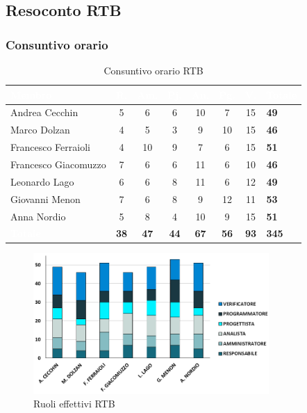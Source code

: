 \newpage

\subsection{Resoconto RTB}
\subsubsection{Consuntivo orario}
{
\setlength{\tabcolsep}{10pt}
\renewcommand{\arraystretch}{1.5}
\begin{table}[h!]
    \centering
    \begin{tabularx}{\textwidth}{| l | c | c | c | c | c | c | X |}
        \hline
        \rowcolor{headerrow} \textbf{\textcolor{white}{Membro}} & \textbf{\textcolor{white}{R.}} & \textbf{\textcolor{white}{Am.}} & \textbf{\textcolor{white}{Pj.}} & \textbf{\textcolor{white}{An.}} & \textbf{\textcolor{white}{Pg.}} & \textbf{\textcolor{white}{V.}} & \textbf{\textcolor{white}{Totale}} \\
        \hline
        Andrea Cecchin & 5 & 6 & 6 & 10 & 7 & 15 & \textbf{49} \\
        \hline
        Marco Dolzan & 4 & 5 & 3 & 9 & 10 & 15 & \textbf{46} \\
        \hline
        Francesco Ferraioli & 4 & 10 & 9 & 7 & 6 & 15 & \textbf{51} \\
        \hline  
        Francesco Giacomuzzo & 7 & 6 & 6 & 11 & 6 & 10 & \textbf{46} \\
        \hline
        Leonardo Lago & 6 & 6 & 8 & 11 & 6 & 12 & \textbf{49} \\
        \hline
        Giovanni Menon & 7 & 6 & 8 & 9 & 12 & 11 & \textbf{53} \\
        \hline
        Anna Nordio & 5 & 8 & 4 & 10 & 9 & 15 & \textbf{51} \\
        \hline
    \cellcolor{headerrow} \textbf{\textcolor{white}{Totale}} & \textbf{38} & \textbf{47} & \textbf{44} & \textbf{67} & \textbf{56} & \textbf{93} & \textbf{345} \\
        \hline
    \end{tabularx} 
    \caption{Consuntivo orario RTB}
    \label{tab:consuntivoorarioRTB}
\end{table}
}

\begin{figure}[h!]
    \centering
    \includegraphics[width=0.8\textwidth]{consRTBruoli.png}
    \caption{Ruoli effettivi RTB}
    \label{fig:consuntivoorarioRTB}
\end{figure}

